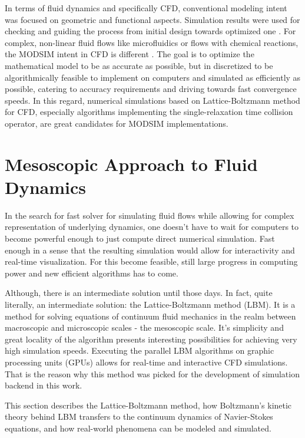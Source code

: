 In terms of fluid dynamics and specifically CFD, conventional modeling intent was focused on geometric and functional aspects. Simulation results were used for checking and guiding the process from initial design towards optimized one  \citep{liAssociationDesignSimulation2016}. For complex, non-linear fluid flows like microfluidics or flows with chemical reactions, the MODSIM intent in CFD is different \citep{zhangLatticeBoltzmannMethod2011}. The goal is to optimize the mathematical model to be as accurate as possible, but in discretized to be algorithmically feasible to implement on computers and simulated as efficiently as possible, catering to accuracy requirements and driving towards fast convergence speeds. In this regard, numerical simulations based on Lattice-Boltzmann method for CFD, especially algorithms implementing the single-relaxation time collision operator, are great candidates for MODSIM implementations. 


\section{Mesoscopic Approach to Fluid Dynamics}\label{sec:meso}
In the search for fast solver for simulating fluid flows while allowing for complex representation of underlying dynamics, one doesn't have to wait for computers to become powerful enough to just compute direct numerical simulation. Fast enough in a sense that the resulting simulation would allow for interactivity and real-time visualization. For this become feasible, still large progress in computing power and new efficient algorithms has to come.

Although, there is an intermediate solution until those days. In fact, quite literally, an intermediate solution: the Lattice-Boltzmann method (LBM). It is a method for solving equations of continuum fluid mechanics in the realm between macroscopic and microscopic scales - the mesoscopic scale. It's simplicity and great locality of the algorithm presents interesting possibilities for achieving very high simulation speeds. Executing the parallel LBM algorithms on graphic processing units (GPUs) allows for real-time and interactive CFD simulations. That is the reason why this method was picked for the development of simulation backend in this work.

This section describes the Lattice-Boltzmann method, how Boltzmann's kinetic theory behind LBM transfers to the continuum dynamics of Navier-Stokes equations, and how real-world phenomena can be modeled and simulated.


